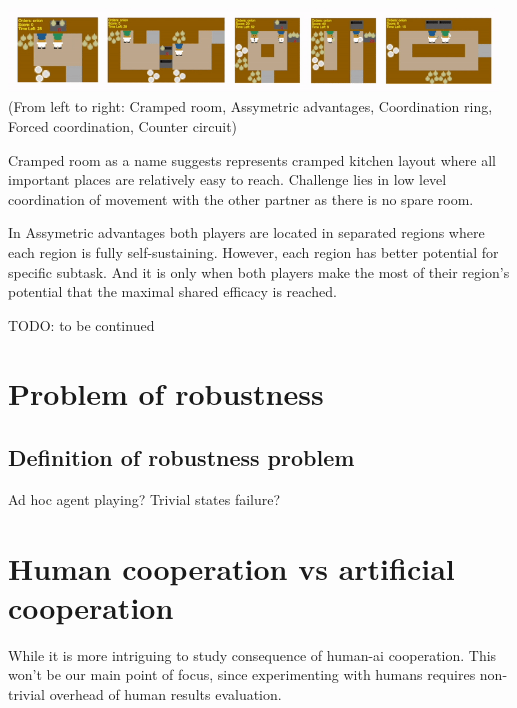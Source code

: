 \includegraphics*[width=13cm]{layouts.png}
\break
(From left to right: Cramped room, Assymetric advantages, Coordination ring, Forced coordination, Counter circuit)
\par 
Cramped room as a name suggests represents cramped kitchen layout where all important places are relatively easy to reach. Challenge lies in low level coordination of movement with the other partner as there is no spare room.
\par
In Assymetric advantages both players are located in separated regions where each region is fully self-sustaining. However, each region has better potential for specific subtask. 
And it is only when both players make the most of their region's potential that the maximal shared efficacy is reached.

TODO: to be continued






\section{Problem of robustness}

\subsection*{Definition of robustness problem}
Ad hoc agent playing? Trivial states failure?

\section{Human cooperation vs artificial cooperation}
While it is more intriguing to study consequence of human-ai cooperation. This won't be our main point of focus, since experimenting with humans requires non-trivial overhead of human results evaluation.

